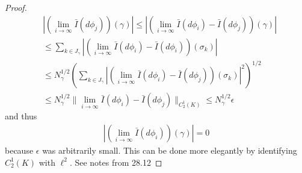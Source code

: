 \documentclass[12pt,a4paper]{article}
\theoremstyle{definition}
\newcommand{\aop}{\mathscr{A}}
\newcommand{\rop}{\mathscr{R}} %
\begin{document}
\begin{proof}
    \begin{align*}
        &\left| \left( \lim\limits_{i \rightarrow \infty} \bar{I}(d\phi_j) 
        \right) (\gamma) \right| 
        \leq \left| \left( \lim\limits_{i \rightarrow \infty} \bar{I}(d\phi_i) 
        - \bar{I}(d\phi_j) 
        \right) (\gamma) \right| \\
        &\leq \sum\limits_{k \in J_\gamma} 
        \left| \left( 
            \lim\limits_{i \rightarrow \infty} \bar{I}(d\phi_i) 
            - \bar{I}(d\phi_i) 
        \right) (\sigma_k) \right| \\
        &\leq N^{1/2}_\gamma \left(
            \sum\limits_{k \in J_\gamma} 
            \left| \left( 
                    \lim\limits_{i \rightarrow \infty} \bar{I}(d\phi_i) 
                    - \bar{I}(d\phi_j) 
                \right) (\sigma_k) 
            \right|^2
        \right)^{1/2} \\
        &\leq N^{1/2}_\gamma \lVert  
            \lim\limits_{i \rightarrow \infty} \bar{I}(d\phi_i)
            - \bar{I}(d\phi_j)
        \rVert _{C^{1}_2(K)} 
        \leq N^{1/2}_\gamma \epsilon
    \end{align*}
    and thus 
    \begin{align*}
        \left| \left( \lim\limits_{i \rightarrow \infty} \bar{I}(d\phi_i) 
        \right) (\gamma) \right| = 0
    \end{align*}
    because $\epsilon$ was arbitrarily small. {\color{red} This can be done 
    more elegantly by identifying $C^1_2(K)$ with $\ell^2$. 
    See notes from 28.12}
\end{proof}
\end{document}
